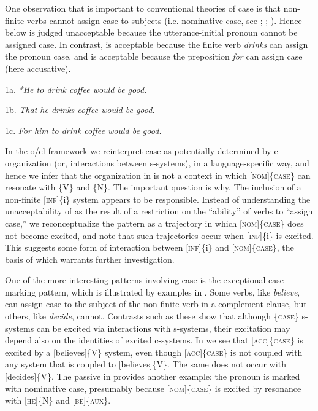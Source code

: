   One observation that is important to conventional theories of case is that non-finite verbs cannot assign case to subjects (i.e. nominative case, see \citealt{Chomsky1980}; \citealt{ChomskyLasnik1977}; \citealt{Vergnaud2006}). Hence  below is judged unacceptable because the utterance-initial pronoun cannot be assigned case. In contrast,  is acceptable because the finite verb \textit{drinks} can assign the pronoun case, and  is acceptable because the preposition \textit{for} can assign case (here accusative).

  1a. \textit{*He to drink coffee would be good.}

  1b.  \textit{That he drinks coffee would be good.}

  1c.  \textit{For him to drink coffee would be good.}

  In the o/el framework we reinterpret case as potentially determined by e-organization (or, interactions between s-systems), in a language-specific way, and hence we infer that the organization in  is not a context in which [\textsc{nom}]\{\textsc{case}\} can resonate with \{V\} and \{N\}. The important question is why. The inclusion of a non-finite [\textsc{inf}]\{i\} system appears to be responsible. Instead of understanding the unacceptability of  as the result of a restriction on the “ability” of verbs to “assign case,” we reconceptualize the pattern as a trajectory in which [\textsc{nom}]\{\textsc{case}\} does not become excited, and note that such trajectories occur when [\textsc{inf}]\{i\} is excited. This suggests some form of interaction between [\textsc{inf}]\{i\} and [\textsc{nom}]\{\textsc{case}\}, the basis of which warrants further investigation.

  One of the more interesting patterns involving case is the exceptional case marking pattern, which is illustrated by examples in . Some verbs, like \textit{believe}, can assign case to the subject of the non-finite verb in a complement clause, but others, like \textit{decide}, cannot. Contrasts such as these show that although \{\textsc{case}\} s-systems can be excited via interactions with s-systems, their excitation may depend also on the identities of excited c-systems. In  we see that \textsc{[acc]\{case\}} is excited by a [believes]\{V\} system, even though \textsc{[acc]\{case\}} is not coupled with any system that is coupled to [believes]\{V\}. The same does not occur with [decides]\{V\}. The passive in  provides another example: the pronoun is marked with nominative case, presumably because [\textsc{nom}]\{\textsc{case}\} is excited by resonance with [\textsc{he}]\{N\} and [\textsc{be}]\{\textsc{aux}\}.

